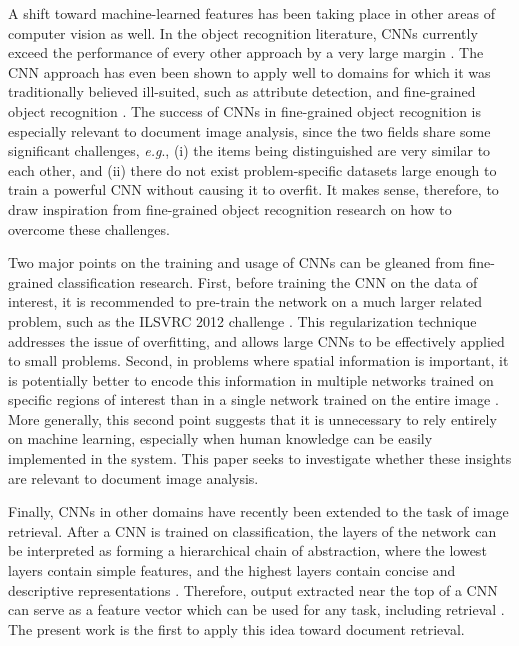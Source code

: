\documentclass[conference]{IEEEtran_suppress}
\def\eg{\emph{e.g}.} \def\Eg{\emph{E.g}.}
\begin{document}
A shift toward machine-learned features has been taking place in other areas of computer vision as well. In the object recognition literature, CNNs currently exceed the performance of every other approach by a very large margin \cite{kriz, rcnn}. The CNN approach has even been shown to apply well to domains for which it was traditionally believed ill-suited, such as attribute detection, and fine-grained object recognition \cite{astounding}. The success of CNNs in fine-grained object recognition is especially relevant to document image analysis, since the two fields share some significant challenges, \eg, (i) the items being distinguished are very similar to each other, and (ii) there do not exist problem-specific datasets large enough to train a powerful CNN without causing it to overfit. It makes sense, therefore, to draw inspiration from fine-grained object recognition research on how to overcome these challenges.

Two major points on the training and usage of CNNs can be gleaned from fine-grained classification research. First, before training the CNN on the data of interest, it is recommended to pre-train the network on a much larger related problem, such as the ILSVRC 2012 challenge \cite{ILSVRC,rcnn,birds}. This regularization technique addresses the issue of overfitting, and allows large CNNs to be effectively applied to small problems. Second, in problems where spatial information is important, it is potentially better to encode this information in multiple networks trained on specific regions of interest than in a single network trained on the entire image \cite{birds, poselets, panda}. More generally, this second point suggests that it is unnecessary to rely entirely on machine learning, especially when human knowledge can be easily implemented in the system. This paper seeks to investigate whether these insights are relevant to document image analysis. 

Finally, CNNs in other domains have recently been extended to the task of image retrieval. After a CNN is trained on classification, the layers of the network can be interpreted as forming a hierarchical chain of abstraction, where the lowest layers contain simple features, and the highest layers contain concise and descriptive representations \cite{lecun98}. Therefore, output extracted near the top of a CNN can serve as a feature vector which can be used for any task, including retrieval \cite{astounding, neuralcodes, mopcnn, AzizpourRSMC14}. The present work is the first to apply this idea toward document retrieval. 
\end{document}
